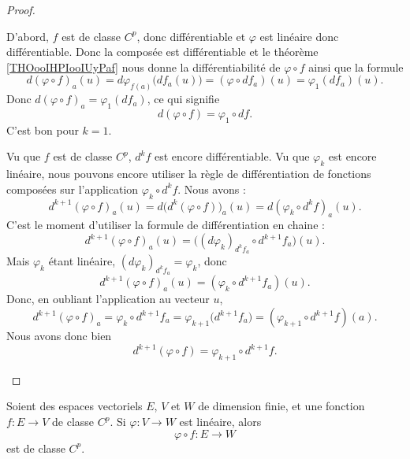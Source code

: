 \begin{proof}
\begin{subproof}
		D'abord, \( f\) est de classe \( C^p\), donc différentiable et \( \varphi\) est linéaire donc différentiable. Donc la composée est différentiable et le théorème \ref{THOooIHPIooIUyPaf} nous donne la différentiabilité de \( \varphi\circ f\) ainsi que la formule
		\begin{equation}
			d(\varphi\circ f)_a(u)=d\varphi_{f(a)}\big( df_a(u) \big)=(\varphi\circ df_a)(u)=\varphi_1(df_a)(u).
		\end{equation}
		Donc \( d(\varphi\circ f)_a=\varphi_1(df_a)\), ce qui signifie
		\begin{equation}
			d(\varphi\circ f)=\varphi_1\circ df.
		\end{equation}
		C'est bon pour \( k=1\).



		Vu que \( f\) est de classe \( C^p\), \( d^kf\) est encore différentiable. Vu que \( \varphi_k\) est encore linéaire, nous pouvons encore utiliser la règle de différentiation de fonctions composées sur l'application \( \varphi_k\circ d^kf\). Nous avons :
		\begin{equation}
			d^{k+1}(\varphi\circ f)_a(u)=d\big( d^k(\varphi\circ f) \big)_a(u)=d(\varphi_k\circ d^kf)_a(u).
		\end{equation}
		C'est le moment d'utiliser la formule de différentiation en chaine :
		\begin{equation}
			d^{k+1}(\varphi\circ f)_a(u)=\big( (d\varphi_k)_{d^kf_a}\circ d^{k+1}f_a \big)(u).
		\end{equation}
		Mais \( \varphi_k\) étant linéaire, \( (d\varphi_k)_{d^kf_a}=\varphi_k\), donc
		\begin{equation}
			d^{k+1}(\varphi\circ f)_a(u)=(\varphi_k\circ d^{k+1}f_a)(u).
		\end{equation}
		Donc, en oubliant l'application au vecteur \( u\),
		\begin{equation}
			d^{k+1}(\varphi\circ f)_a=\varphi_k\circ d^{k+1}f_a=\varphi_{k+1}\big( d^{k+1}f_a \big)=(\varphi_{k+1}\circ d^{k+1}f)(a).
		\end{equation}
		Nous avons donc bien
		\begin{equation}
			d^{k+1}(\varphi\circ f)=\varphi_{k+1}\circ d^{k+1}f.
		\end{equation}
	\end{subproof}
\end{proof}


\begin{proposition}		\label{PROPooGJGVooWnbeAe}
	Soient des espaces vectoriels \( E\),  \( V\) et \( W\) de dimension finie, et une fonction \( f\colon E\to V\) de classe \( C^p\). Si \( \varphi\colon V\to W\) est linéaire, alors
	\begin{equation}
		\varphi\circ f\colon E\to W
	\end{equation}
	est de classe \( C^p\).
\end{proposition}

